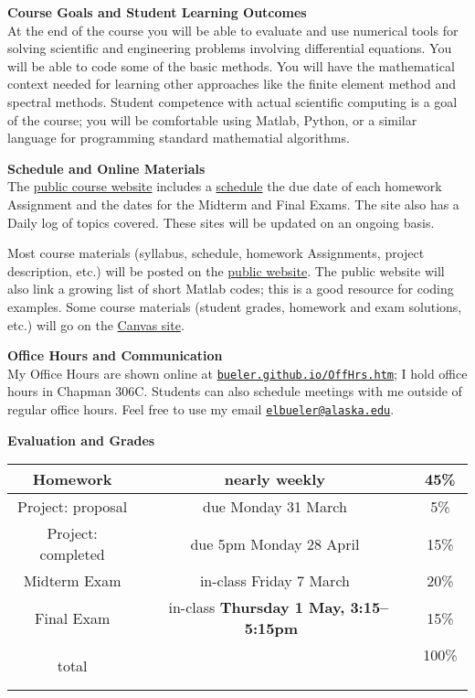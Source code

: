 \documentclass[12pt]{article}
\renewcommand{\emph}[1]{\textsf{\textbf{#1}}}
\newcommand{\localhead}[1]{\par\smallskip\textbf{#1} \smallskip\nobreak\\}%
\def\heading#1{\localhead{\large\emph{#1}}}
\begin{document}
\heading{Course Goals and Student Learning Outcomes}
At the end of the course you will be able to evaluate and use numerical tools for solving scientific and engineering problems involving differential equations.  You will be able to code some of the basic methods.  You will have the mathematical context needed for learning other approaches like the finite element method and spectral methods.  Student competence with actual scientific computing is a goal of the course; you will be comfortable using Matlab, Python, or a similar language for programming standard mathematial algorithms.


\heading{Schedule and Online Materials}
The \href{https://bueler.github.io/nade/}{public course website} includes a \href{https://bueler.github.io/nade/assets/general/S25/schedule.pdf}{schedule} the due date of each homework Assignment and the dates for the Midterm and Final Exams.  The site also has a Daily log of topics covered.  These sites will be updated on an ongoing basis.

Most course materials (syllabus, schedule, homework Assignments, project description, etc.) will be posted on the \href{https://bueler.github.io/nade/}{public website}.  The public website will also link a growing list of short Matlab codes; this is a good resource for coding examples.  Some course materials (student grades, homework and exam solutions, etc.) will go on the \href{https://canvas.alaska.edu/courses/24194}{Canvas site}.


\heading{Office Hours and Communication}
My Office Hours are shown online at \href{http://bueler.github.io/OffHrs.htm}{\texttt{bueler.github.io/OffHrs.htm}}; I hold office hours in Chapman 306C.  Students can also schedule meetings with me outside of regular office hours.  Feel free to use my email \href{mailto:elbueler@alaska.edu}{\texttt{elbueler@alaska.edu}}.

\medskip
\heading{Evaluation and Grades}
\vskip -10pt

\begin{tabular}{|c|c|c|}
\hline
Homework & nearly weekly & 45\% \\
\hline
Project: proposal & due Monday 31 March & 5\%  \\
\hline
Project: completed & due 5pm Monday 28 April & 15\%  \\
\hline
Midterm Exam & in-class Friday 7 March & 20\%  \\
\hline
Final Exam & \, in-class \emph{Thursday 1 May, 3:15--5:15pm} \, & 15\% \\
\hline
total & & 100\% \, \\
\hline
\end{tabular}
\end{document}

